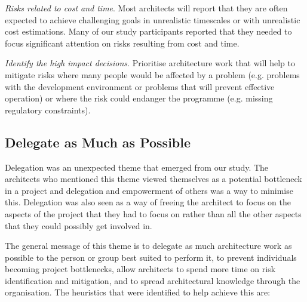 \begin{description}
	\item \emph{Risks related to cost and time}.  Most architects will report that they are often expected to achieve challenging goals in unrealistic timescales or with unrealistic cost estimations.  Many of our study participants reported that they needed to focus significant attention on risks resulting from cost and time.
	\item \emph{Identify the high impact decisions}.  Prioritise architecture work that will help to mitigate risks where many people would be affected by a problem (e.g. problems with the development environment or problems that will prevent effective operation) or where the risk could endanger the programme (e.g. missing regulatory constraints).
\end{description}

\subsection{Delegate as Much as Possible}

Delegation was an unexpected theme that emerged from our study. The architects who mentioned this theme viewed themselves as a potential bottleneck in a project and delegation and empowerment of others was a way to minimise this.  Delegation was also seen as a way of freeing the architect to focus on the aspects of the project that they had to focus on rather than all the other aspects that they could possibly get involved in.

The general message of this theme is to delegate as much architecture work as possible to the person or group best suited to perform it, to prevent individuals becoming project bottlenecks, allow architects to spend more time on risk identification and mitigation, and to spread architectural knowledge through the organisation.  The heuristics that were identified to help achieve this are:

